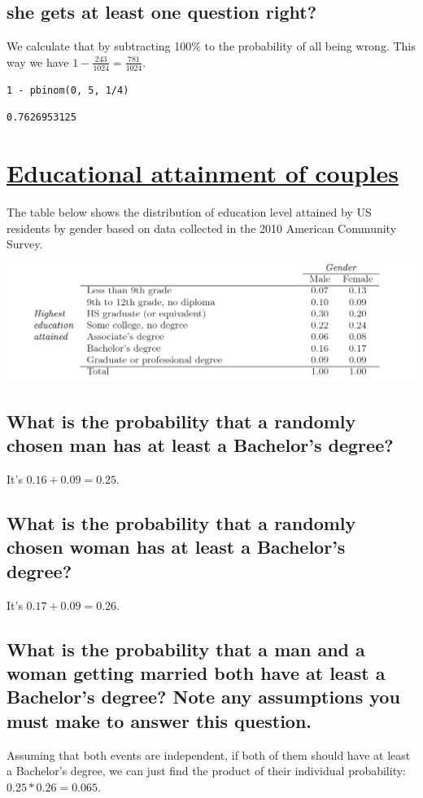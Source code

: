\documentclass[11pt]{article}
\begin{document}
\subsection{she gets at least one question right?}
\label{sec:org6e98496}
We calculate that by subtracting 100\% to the probability of all being wrong. This way we have \(1 - \frac{243}{1024} = \frac{781}{1024}\).

\begin{verbatim}
1 - pbinom(0, 5, 1/4)
\end{verbatim}

\begin{verbatim}
0.7626953125
\end{verbatim}

\section{\underline{Educational attainment of couples}}
\label{sec:org987c76e}
The table below shows the distribution of education level attained by US residents by gender based on data collected in the 2010 American Community Survey.
\begin{center}
\includegraphics[width=.9\linewidth]{table.png}
\end{center}

\subsection{What is the probability that a randomly chosen man has at least a Bachelor's degree?}
\label{sec:org2822706}
It's \(0.16 + 0.09 = 0.25\).
\subsection{What is the probability that a randomly chosen woman has at least a Bachelor's degree?}
\label{sec:orgbda83d1}
It's \(0.17 + 0.09 = 0.26\).
\subsection{What is the probability that a man and a woman getting married both have at least a Bachelor's degree? Note any assumptions you must make to answer this question.}
\label{sec:org292a48b}
Assuming that both events are independent, if both of them should have at least a Bachelor's degree, we can just find the product of their individual probability: \(0.25 * 0.26 = 0.065\). 
\end{document}
